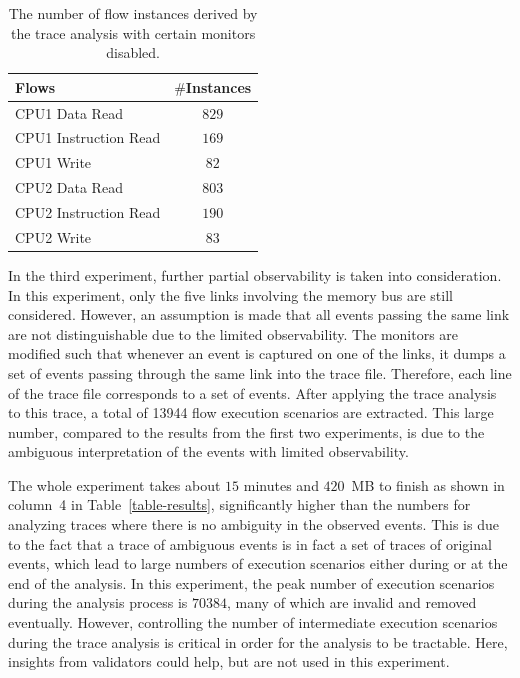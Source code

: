 \documentclass[12pt,frontmatter,copyright,thesis]{usfmanus}
\begin{document}
\begin{table}[tb]
\caption{The number of flow instances derived by the trace analysis with certain monitors disabled.}
\begin{center}
\begin{tabular}{|l|c|}
\hline
Flows & $\#$Instances \\
\hline
\hline
CPU1 Data Read			&  $829$\\
CPU1 Instruction Read		&  $169$\\
CPU1 Write				&  $82$\\
\hline
CPU2 Data Read			&  $803$\\
CPU2 Instruction Read		&  $190$\\
CPU2 Write				&  $83$\\
\hline
\end{tabular}
\end{center}
\label{table-par-obs}
\end{table}%

In the third experiment, further partial observability is taken into consideration.  In this experiment, only the five links involving the memory bus are still considered.  However, an assumption is made that all events passing the same link are not distinguishable due to the limited observability.  The monitors are modified such that whenever an event is captured on one of the links, it dumps a set of events passing through the same link into the trace file.  Therefore, each line of the trace file corresponds to a set of events.  After applying the trace analysis to this trace,  a total of 13944 flow execution scenarios are extracted.    This large number, compared to the results from the first two experiments, is due to the ambiguous interpretation of the events with limited observability.  

The whole experiment takes about $15$ minutes and $420$~MB to finish as shown in column~4
in Table~\ref{table-results}, significantly higher than the numbers for analyzing traces where there is no ambiguity in the observed events.  This is due to the fact that a trace of ambiguous events is in fact a set of traces of original events, which lead to large numbers of execution scenarios either during or at the end of the analysis.  In this experiment, the peak number of execution scenarios during the analysis process is $70384$, many of which are invalid and removed eventually.  However, controlling the number of intermediate execution scenarios during the trace analysis is critical in order for the analysis to be tractable.  Here, insights from validators could help, but are not used in this experiment.   
\end{document}
